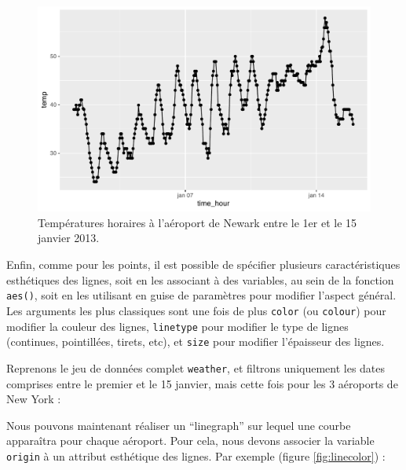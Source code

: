 \documentclass[a4paperpaper,]{article}
\newenvironment{Shaded}{\begin{snugshade}}{\end{snugshade}}
\newcommand{\DecValTok}[1]{\textcolor[rgb]{0.69,0.50,0.00}{#1}}
\newcommand{\KeywordTok}[1]{\textcolor[rgb]{0.12,0.11,0.11}{\textbf{#1}}}
\newcommand{\NormalTok}[1]{\textcolor[rgb]{0.12,0.11,0.11}{#1}}
\newcommand{\OperatorTok}[1]{\textcolor[rgb]{0.12,0.11,0.11}{#1}}
\newcommand{\StringTok}[1]{\textcolor[rgb]{0.75,0.01,0.01}{#1}}
\begin{document}
\begin{figure}[htpb]

{\centering \includegraphics[width=0.9\linewidth]{figure/lineplotgraph-1} 

}

\caption{Températures horaires à l'aéroport de Newark entre le 1er et le 15 janvier 2013.}\label{fig:lineplotgraph}
\end{figure}

Enfin, comme pour les points, il est possible de spécifier plusieurs caractéristiques esthétiques des lignes, soit en les associant à des variables, au sein de la fonction \texttt{aes()}, soit en les utilisant en guise de paramètres pour modifier l'aspect général. Les arguments les plus classiques sont une fois de plus \texttt{color} (ou \texttt{colour}) pour modifier la couleur des lignes, \texttt{linetype} pour modifier le type de lignes (continues, pointillées, tirets, etc), et \texttt{size} pour modifier l'épaisseur des lignes.

Reprenons le jeu de données complet \texttt{weather}, et filtrons uniquement les dates comprises entre le premier et le 15 janvier, mais cette fois pour les 3 aéroports de New York :

\begin{Shaded}
\end{Shaded}

Nous pouvons maintenant réaliser un ``linegraph'' sur lequel une courbe apparaîtra pour chaque aéroport. Pour cela, nous devons associer la variable \texttt{origin} à un attribut esthétique des lignes. Par exemple (figure \ref{fig:linecolor}) :
\end{document}

